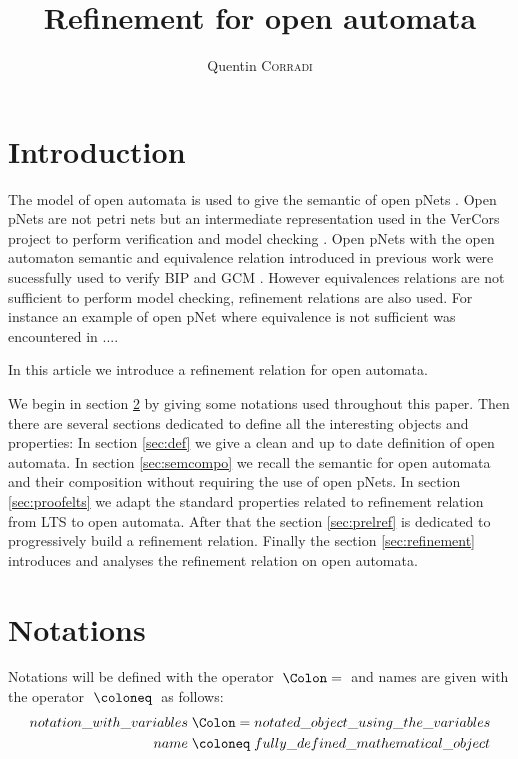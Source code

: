 \documentclass{article}
\title{Refinement for open automata}
\author{Quentin \textsc{Corradi}}
\begin{document}
\maketitle

\section{Introduction}
The model of open automata is used to give the semantic of open pNets \cite{2007.10770}.
Open pNets are not petri nets but an intermediate representation used in the VerCors project to perform verification and model checking \cite{henrio:01252323}.
Open pNets with the open automaton semantic and equivalence relation introduced in previous work \cite{2007.10770} were sucessfully used to verify BIP and GCM \cite{qin:01823507, ameurboulifa:01526055}.
However equivalences relations are not sufficient to perform model checking, refinement relations are also used.
For instance an example of open pNet where equivalence is not sufficient was encountered in ....

In this article we introduce a refinement relation for open automata. %

We begin in section \ref{sec:notations} by giving some notations used throughout this paper.
Then there are several sections dedicated to define all the interesting objects and properties:
In section \ref{sec:def} we give a clean and up to date definition of open automata.
In section \ref{sec:semcompo} we recall the semantic for open automata and their composition without requiring the use of open pNets.
In section \ref{sec:proofelts} we adapt the standard properties related to refinement relation from LTS to open automata.
After that the section \ref{sec:prelref} is dedicated to progressively build a refinement relation.
Finally the section \ref{sec:refinement} introduces and analyses the refinement relation on open automata.


\section{Notations}\label{sec:notations}
Notations will be defined with the operator \(\defnotation\) and names are given with the operator \(\defobject\) as follows:
\begin{align*}
	notation\_with\_variables & \defnotation notated\_object\_using\_the\_variables \\
	name & \defobject fully\_defined\_mathematical\_object
\end{align*}
\end{document}
